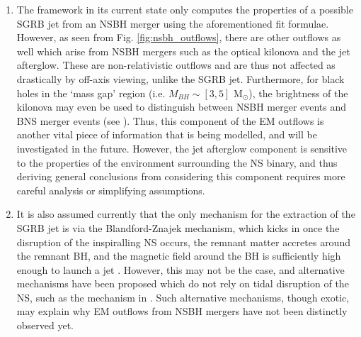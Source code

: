 \begin{enumerate}
            \item The framework in its current state only computes the properties of a
                possible SGRB jet from an NSBH merger using the aforementioned fit
                formulae. However, as seen from Fig. \ref{fig:nsbh_outflows}, there are
                other outflows as well which arise from NSBH mergers such as the optical
                kilonova and the jet afterglow. These are non-relativistic outflows and
                are thus not affected as drastically by off-axis viewing, unlike the
                SGRB jet. Furthermore, for black holes in the `mass gap' region (i.e.
                $M_{BH} \sim [3, 5]$ M$_\odot$), the brightness of the kilonova may even
                be used to distinguish between NSBH merger events and BNS merger events
                (see \cite{barbieri_2019b}). Thus, this component of the EM outflows is
                another vital piece of information that is being modelled, and will be
                investigated in the future. However, the jet afterglow component is
                sensitive to the properties of the environment surrounding the NS
                binary, and thus deriving general conclusions from considering this
                component requires more careful analysis or simplifying assumptions.

            \item It is also assumed currently that the only mechanism for the
                extraction of the SGRB jet is via the Blandford-Znajek mechanism, which
                kicks in once the disruption of the inspiralling NS occurs, the
                remnant matter accretes around the remnant BH, and the magnetic field
                around the BH is sufficiently high enough to launch a jet . However,
                this may not be the case, and alternative mechanisms have been proposed
                which do not rely on tidal disruption of the NS, such as the mechanism
                in \cite{east_2021}. Such alternative mechanisms, though exotic, may
                explain why EM outflows from NSBH mergers have not been distinctly
                observed yet.


\end{enumerate}
